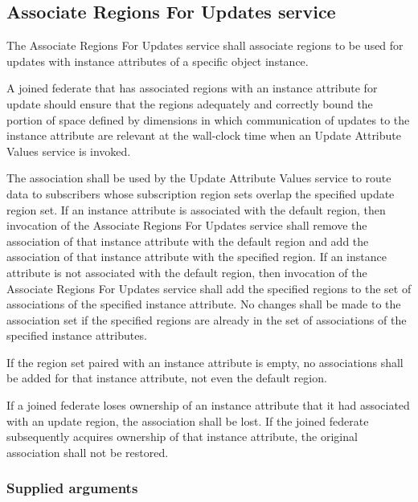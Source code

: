 \begin{compactstdpage}


    \subsection{Associate Regions For Updates service}

    The Associate Regions For Updates service shall associate regions to be used for updates with instance attributes of a specific object instance.

    A joined federate that has associated regions with an instance attribute for update should ensure that the regions adequately and correctly bound the portion of space defined by dimensions in which communication of updates to the instance attribute are relevant at the wall-clock time when an Update Attribute Values service is invoked.

    The association shall be used by the Update Attribute Values service to route data to subscribers whose subscription region sets overlap the specified update region set. If an instance attribute is associated with the default region, then invocation of the Associate Regions For Updates service shall remove the association of that instance attribute with the default region and add the association of that instance attribute with the specified region. If an instance attribute is not associated with the default region, then invocation of the Associate Regions For Updates service shall add the specified regions to the set of associations of the specified instance attribute. No changes shall be made to the association set if the specified regions are already in the set of associations of the specified instance attributes.

    If the region set paired with an instance attribute is empty, no associations shall be added for that instance attribute, not even the default region.

    If a joined federate loses ownership of an instance attribute that it had associated with an update region, the association shall be lost. If the joined federate subsequently acquires ownership of that instance attribute, the original association shall not be restored.

    \subsubsection{Supplied arguments}


\end{compactstdpage}
